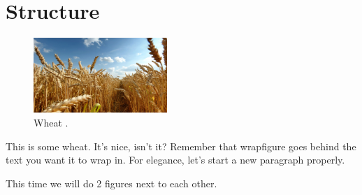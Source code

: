 \documentclass[a4paper]{report}
\begin{document}
\newpage

\chapter{Structure}

\begin{figure}
	
	\centering
	
	\includegraphics[width = 0.45\textwidth]{Wheat}
	\caption{Wheat \cite{Nature}.}
	
\end{figure}

This is some wheat. It's nice, isn't it? Remember that wrapfigure goes behind the text you want it to wrap in. For elegance, let's start a new paragraph properly.
\par
This time we will do 2 figures next to each other.\\\\
\\
\\


\end{document}
